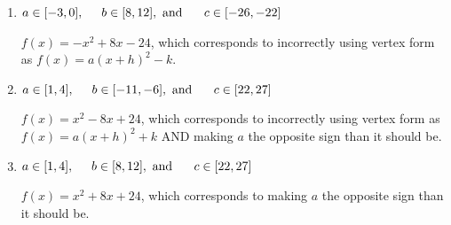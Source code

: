 \documentclass{extbook}[14pt]
\begin{document}
\begin{enumerate}
{\begin{enumerate}[label=\Alph*.]
* $f(x)=-x^{2} -8 x -8$, which is the correct option.
\item \( a \in [-3, 0], \hspace*{5mm} b \in [8, 12], \text{ and } \hspace*{5mm} c \in [-26, -22] \)

$f(x)=-x^{2} +8 x -24$, which corresponds to incorrectly using vertex form as $f(x) = a(x+h)^2 - k$.
\item \( a \in [1, 4], \hspace*{5mm} b \in [-11, -6], \text{ and } \hspace*{5mm} c \in [22, 27] \)

$f(x)=x^{2} -8 x + 24$, which corresponds to incorrectly using vertex form as $f(x) = a(x+h)^2+k$ AND making $a$ the opposite sign than it should be.
\item \( a \in [1, 4], \hspace*{5mm} b \in [8, 12], \text{ and } \hspace*{5mm} c \in [22, 27] \)

$f(x)=x^{2} +8 x + 24$, which corresponds to making $a$ the opposite sign than it should be.
\end{enumerate}

}
\end{enumerate}
\end{document}
